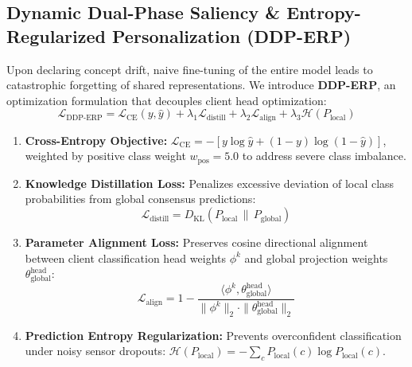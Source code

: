 \documentclass[journal,twocolumn,10pt]{IEEEtran}
\begin{document}
\subsection{Dynamic Dual-Phase Saliency \& Entropy-Regularized Personalization (DDP-ERP)}
Upon declaring concept drift, naive fine-tuning of the entire model leads to catastrophic forgetting of shared representations. We introduce \textbf{DDP-ERP}, an optimization formulation that decouples client head optimization:
\begin{equation}
\mathcal{L}_{\text{DDP-ERP}} = \mathcal{L}_{\text{CE}}(y, \hat{y}) + \lambda_1 \mathcal{L}_{\text{distill}} + \lambda_2 \mathcal{L}_{\text{align}} + \lambda_3 \mathcal{H}(P_{\text{local}})
\end{equation}
\begin{enumerate}
    \item \textbf{Cross-Entropy Objective:} $\mathcal{L}_{\text{CE}} = - [y \log \hat{y} + (1-y) \log(1 - \hat{y})]$, weighted by positive class weight $w_{\text{pos}} = 5.0$ to address severe class imbalance.
    \item \textbf{Knowledge Distillation Loss:} Penalizes excessive deviation of local class probabilities from global consensus predictions:
    \begin{equation}
    \mathcal{L}_{\text{distill}} = D_{\text{KL}}\left(P_{\text{local}} \,\|\, P_{\text{global}}\right)
    \end{equation}
    \item \textbf{Parameter Alignment Loss:} Preserves cosine directional alignment between client classification head weights $\phi^k$ and global projection weights $\theta_{\text{global}}^{\text{head}}$:
    \begin{equation}
    \mathcal{L}_{\text{align}} = 1 - \frac{\langle \phi^k, \theta_{\text{global}}^{\text{head}} \rangle}{\|\phi^k\|_2 \cdot \|\theta_{\text{global}}^{\text{head}}\|_2}
    \end{equation}
    \item \textbf{Prediction Entropy Regularization:} Prevents overconfident classification under noisy sensor dropouts: $\mathcal{H}(P_{\text{local}}) = - \sum_{c} P_{\text{local}}(c) \log P_{\text{local}}(c)$.
\end{enumerate}
\end{document}
